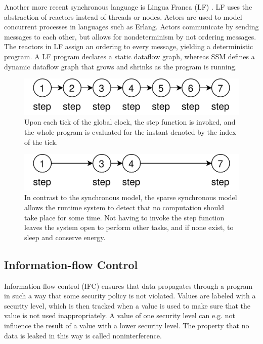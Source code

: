 Another more recent synchronous language is Lingua Franca (LF) \cite{DBLP:journals/tecs/LohstrohMBL21}. LF uses the abstraction
of reactors instead of threads or nodes. Actors are used to model concurrent processes in languages such as Erlang. Actors
communicate by sending messages to each other, but allows for nondeterminism by not ordering messages.
The reactors in LF assign an ordering to every message, yielding a deterministic program.
A LF program declares a static dataflow graph, whereas SSM defines a dynamic dataflow graph that grows and shrinks as the
program is running.

\begin{figure}
    \centering
    \includegraphics[scale=0.2]{graphics/clock-governed.png}
    \caption{Upon each tick of the global clock, the step function is invoked, and the whole program
    is evaluated for the instant denoted by the index of the tick.}
    \label{graphics:global-clock}
\end{figure}

\begin{figure}
    \centering
    \includegraphics[scale=0.2]{graphics/sparse-clock.png}
    \caption{In contrast to the synchronous model, the sparse synchronous model allows the runtime system to
    detect that no computation should take place for some time. Not having to invoke the step function
    leaves the system open to perform other tasks, and if none exist, to sleep and conserve energy.}
    \label{graphics:sparse-clock}
\end{figure}

\subsection{Information-flow Control}

Information-flow control (IFC)\cite{DBLP:series/natosec/HedinS12} ensures that data propagates through a program in such a way that some security policy is
not violated. Values are labeled with a security level, which is then tracked when a value is used to make sure that the
value is not used inappropriately.
A value of one security level can e.g. not influence the result of a value with a lower security level. The property that no data is leaked
in this way is called noninterference.

